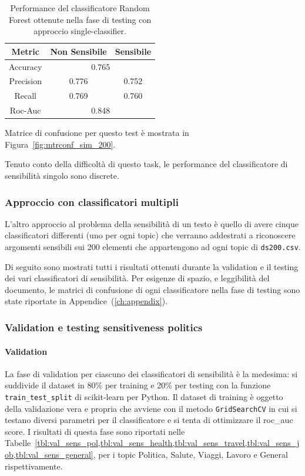 \begin{table}[h]

\centering
\begin{tabular}{|c|c|c|}
\hline
\textbf{Metric} & \textbf{Non Sensibile} & \textbf{Sensibile} \\ \hline
Accuracy & \multicolumn{2}{c|}{0.765} \\ \hline
Precision & 0.776 & 0.752 \\ \hline
Recall & 0.769 & 0.760 \\ \hline
Roc-Auc & \multicolumn{2}{c|}{0.848} \\ \hline
\end{tabular}
\caption{Performance del classificatore Random Forest ottenute nella fase di testing con approccio single-classifier.}
\label{tbl:training_sens}
\end{table}
\FloatBarrier

Matrice di confusione per questo test è mostrata in Figura~\ref{fig:mtrconf_sim_200}.


Tenuto conto della difficoltà di questo task, le performance del classificatore di sensibilità singolo sono discrete.

\subsubsection{Approccio con classificatori multipli}
\label{sssec:multiclass}
L'altro approccio al problema della sensibilità di un testo è quello di avere cinque classificatori differenti (uno per ogni topic) che verranno addestrati a riconoscere argomenti sensibili sui 200 elementi che appartengono ad ogni topic di {\tt ds200.csv}.

Di seguito sono mostrati tutti i risultati ottenuti durante la validation e il testing dei vari classificatori di sensibilità. Per esigenze di spazio, e leggibilità del documento, le matrici di confusione di ogni classificatore nella fase di testing sono state riportate in Appendice~(\ref{ch:appendix}).

\subsubsection{Validation e testing sensitiveness politics}
\label{sssec:val_testing_pol}
\paragraph{Validation} La fase di validation per ciascuno dei classificatori di sensibilità è la medesima: si suddivide il dataset in 80\% per training e 20\% per testing con la funzione {\tt train\_test\_split} di scikit-learn per Python. Il dataset di training è oggetto della validazione vera e propria che avviene con il metodo {\tt GridSearchCV} in cui si testano diversi parametri per il classificatore e si tenta di ottimizzare il roc\_auc score.  I risultati di questa fase sono riportati nelle Tabelle~\cref{tbl:val_sens_pol,tbl:val_sens_health,tbl:val_sens_travel,tbl:val_sens_job,tbl:val_sens_general}, per i topic Politica, Salute, Viaggi, Lavoro e General rispettivamente.

